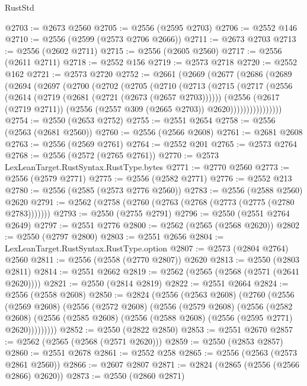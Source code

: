 \begin{lexlean}{RustStd}
\begin{coremodule}
@2703 := @2673 @2560
@2705 := @2556 (@2595 @2703)
@2706 := @2552 @146
@2710 := @2556 (@2599 (@2573 @2706 @2666))
@2711 := @2673 @2703
@2713 := @2556 (@2602 @2711)
@2715 := @2556 (@2605 @2560)
@2717 := @2556 (@2611 @2711)
@2718 := @2552 @156
@2719 := @2573 @2718
@2720 := @2552 @162
@2721 := @2573 @2720
@2752 := @2661
    (@2669
      (@2677
        (@2686
          (@2689
            (@2694
              (@2697
                (@2700
                  (@2702
                    (@2705
                      (@2710
                        (@2713
                          (@2715
                            (@2717
                              (@2556
                                (@2614 (@2719 (@2681 (@2721 (@2673 (@2657 @2703))))))
                                (@2556
                                  (@2617 (@2719 @2711))
                                  (@2556 (@2557 @309 (@2665 @2703)) @2620))))))))))))))))
@2754 := @2550 (@2653 @2752)
@2755 := @2551 @2654
@2758 := @2556 (@2563 (@2681 @2560))
@2760 := @2556 (@2566 @2608)
@2761 := @2681 @2608
@2763 := @2556 (@2569 @2761)
@2764 := @2552 @201
@2765 := @2573 @2764
@2768 := @2556 (@2572 (@2765 @2761))
@2770 := @2573 LexLeanTarget.RustSyntax.RustType.bytes
@2771 := @2770 @2560
@2773 := @2556 (@2579 @2771)
@2775 := @2556 (@2582 @2771)
@2776 := @2552 @213
@2780 := @2556 (@2585 (@2573 @2776 @2560))
@2783 := @2556 (@2588 @2560) @2620
@2791 := @2562 (@2758 (@2760 (@2763 (@2768 (@2773 (@2775 (@2780 @2783)))))))
@2793 := @2550 (@2755 @2791)
@2796 := @2550 (@2551 @2764 @2649)
@2797 := @2551 @2776
@2800 := @2562 (@2565 (@2568 @2620))
@2802 := @2550 (@2797 @2800)
@2803 := @2551 @2656
@2804 := LexLeanTarget.RustSyntax.RustType.option
@2807 := @2573 (@2804 @2764) @2560
@2811 := @2556 (@2558 (@2770 @2807)) @2620
@2813 := @2550 (@2803 @2811)
@2814 := @2551 @2662
@2819 := @2562 (@2565 (@2568 (@2571 (@2641 @2620))))
@2821 := @2550 (@2814 @2819)
@2822 := @2551 @2664
@2824 := @2556 (@2558 @2608)
@2850 := @2824
    (@2556
      (@2563 @2608)
      (@2760
        (@2556
          (@2569 @2608)
          (@2556
            (@2572 @2608)
            (@2556
              (@2579 @2608)
              (@2556
                (@2582 @2608)
                (@2556 (@2585 @2608) (@2556 (@2588 @2608) (@2556 (@2595 @2771) @2620)))))))))
@2852 := @2550 (@2822 @2850)
@2853 := @2551 @2670
@2857 := @2562 (@2565 (@2568 (@2571 @2620)))
@2859 := @2550 (@2853 @2857)
@2860 := @2551 @2678
@2861 := @2552 @258
@2865 := @2556 (@2563 (@2573 @2861 @2560))
@2866 := @2607 @2807
@2871 := @2824 (@2865 (@2556 (@2566 @2866) @2620))
@2873 := @2550 (@2860 @2871)

\end{coremodule}
\end{lexlean}
